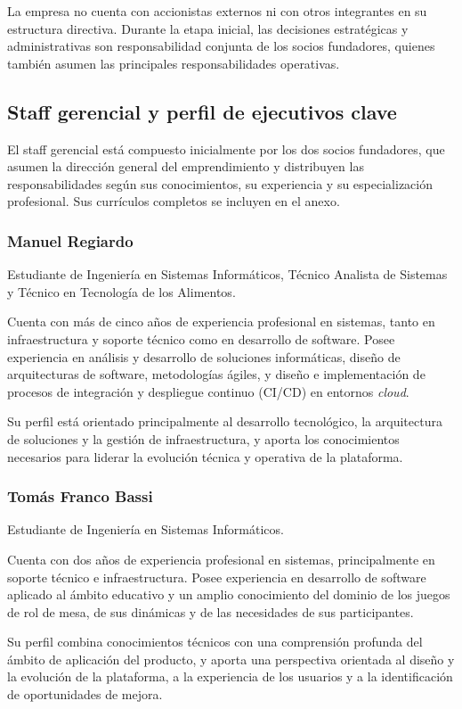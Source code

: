 La empresa no cuenta con accionistas externos ni con otros integrantes en su estructura directiva. Durante la etapa inicial, las decisiones estratégicas y administrativas son responsabilidad conjunta de los socios fundadores, quienes también asumen las principales responsabilidades operativas.

\subsection{Staff gerencial y perfil de ejecutivos clave}
El staff gerencial está compuesto inicialmente por los dos socios fundadores, que asumen la dirección general del emprendimiento y distribuyen las responsabilidades según sus conocimientos, su experiencia y su especialización profesional. Sus currículos completos se incluyen en el anexo.

\subsubsection{Manuel Regiardo}
Estudiante de Ingeniería en Sistemas Informáticos, Técnico Analista de Sistemas y Técnico en Tecnología de los Alimentos.

Cuenta con más de cinco años de experiencia profesional en sistemas, tanto en infraestructura y soporte técnico como en desarrollo de software. Posee experiencia en análisis y desarrollo de soluciones informáticas, diseño de arquitecturas de software, metodologías ágiles, y diseño e implementación de procesos de integración y despliegue continuo (CI/CD) en entornos \textit{cloud}.

Su perfil está orientado principalmente al desarrollo tecnológico, la arquitectura de soluciones y la gestión de infraestructura, y aporta los conocimientos necesarios para liderar la evolución técnica y operativa de la plataforma.

\subsubsection{Tomás Franco Bassi}
Estudiante de Ingeniería en Sistemas Informáticos.

Cuenta con dos años de experiencia profesional en sistemas, principalmente en soporte técnico e infraestructura. Posee experiencia en desarrollo de software aplicado al ámbito educativo y un amplio conocimiento del dominio de los juegos de rol de mesa, de sus dinámicas y de las necesidades de sus participantes.

Su perfil combina conocimientos técnicos con una comprensión profunda del ámbito de aplicación del producto, y aporta una perspectiva orientada al diseño y la evolución de la plataforma, a la experiencia de los usuarios y a la identificación de oportunidades de mejora.


